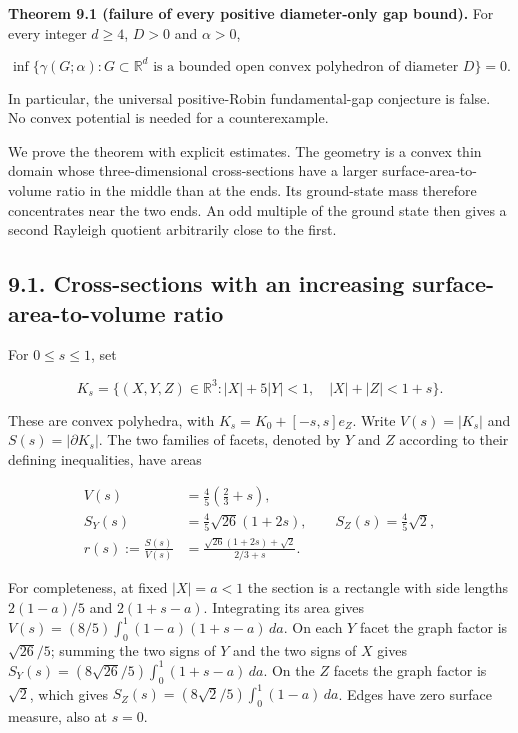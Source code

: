 \documentclass[11pt]{article}
\begin{document}
\textbf{Theorem 9.1 (failure of every positive diameter-only gap
bound).} For every integer \(d\ge4\), \(D>0\) and \(\alpha>0\),

\[
\inf\{\gamma(G;\alpha):G\subset\mathbb R^d
\text{ is a bounded open convex polyhedron of diameter }D\}=0.
\tag{9.3}
\]

In particular, the universal positive-Robin fundamental-gap conjecture
is false. No convex potential is needed for a counterexample.

We prove the theorem with explicit estimates. The geometry is a convex
thin domain whose three-dimensional cross-sections have a larger
surface-area-to-volume ratio in the middle than at the ends. Its
ground-state mass therefore concentrates near the two ends. An odd
multiple of the ground state then gives a second Rayleigh quotient
arbitrarily close to the first.

\subsection{9.1. Cross-sections with an increasing
surface-area-to-volume
ratio}\label{cross-sections-with-an-increasing-surface-area-to-volume-ratio}

For \(0\le s\le1\), set

\[
K_s=\{(X,Y,Z)\in\mathbb R^3:
 |X|+5|Y|<1,\quad |X|+|Z|<1+s\}.
\tag{9.4}
\]

These are convex polyhedra, with \(K_s=K_0+[-s,s]e_Z\). Write
\(V(s)=|K_s|\) and \(S(s)=|\partial K_s|\). The two families of facets,
denoted by \(Y\) and \(Z\) according to their defining inequalities,
have areas

\[
\begin{aligned}
V(s)&=\frac45\left(\frac23+s\right),\\
S_Y(s)&=\frac45\sqrt{26}(1+2s),\qquad
S_Z(s)=\frac45\sqrt2,\\
r(s):=\frac{S(s)}{V(s)}
&=\frac{\sqrt{26}(1+2s)+\sqrt2}{2/3+s}.
\end{aligned}
\tag{9.5}
\]

For completeness, at fixed \(|X|=a<1\) the section is a rectangle with
side lengths \(2(1-a)/5\) and \(2(1+s-a)\). Integrating its area gives
\(V(s)=(8/5)\int_0^1(1-a)(1+s-a)\,da\). On each \(Y\) facet the graph
factor is \(\sqrt{26}/5\); summing the two signs of \(Y\) and the two
signs of \(X\) gives \(S_Y(s)=(8\sqrt{26}/5)\int_0^1(1+s-a)\,da\). On
the \(Z\) facets the graph factor is \(\sqrt2\), which gives
\(S_Z(s)=(8\sqrt2/5)\int_0^1(1-a)\,da\). Edges have zero surface
measure, also at \(s=0\).
\end{document}
